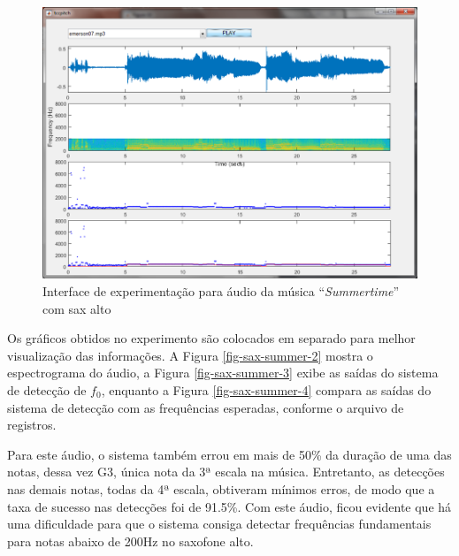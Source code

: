 \begin{figure}
	\centering
	\includegraphics[width=0.75\linewidth]{pasta1_figuras/sax-summer.png}
	\caption{Interface de experimentação para áudio da música ``\textit{Summertime}'' com sax alto}
	\label{fig-sax-summer}
\end{figure}

Os gráficos obtidos no experimento são colocados em separado para melhor visualização das informações. A Figura \ref{fig-sax-summer-2} mostra o espectrograma do áudio, a Figura \ref{fig-sax-summer-3} exibe as saídas do sistema de detecção de $f_0$, enquanto a Figura \ref{fig-sax-summer-4} compara as saídas do sistema de detecção com as frequências esperadas, conforme o arquivo de registros.


Para este áudio, o sistema também errou em mais de 50\% da duração de uma das notas, dessa vez G3, única nota da 3ª escala na música. Entretanto, as detecções nas demais notas, todas da 4ª escala, obtiveram mínimos erros, de modo que a taxa de sucesso nas detecções foi de 91.5\%. Com este áudio, ficou evidente que há uma dificuldade para que o sistema consiga detectar frequências fundamentais para notas abaixo de 200Hz no saxofone alto.


